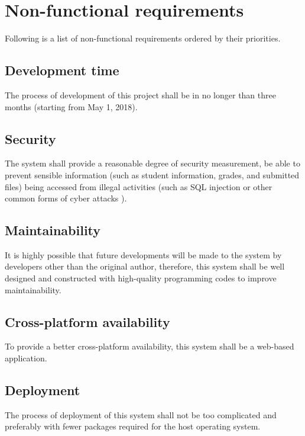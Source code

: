 \pagebreak

\section{Non-functional requirements}
Following is a list of non-functional requirements ordered by their priorities.

\subsection{Development time}
The process of development of this project shall be in no longer than three
months (starting from May 1, 2018).

\subsection{Security}
The system shall provide a reasonable degree of security measurement, 
be able to
prevent sensible information (such as student information, grades, and
submitted files) being accessed from illegal activities (such as SQL injection 
or other common forms of cyber attacks \cite{cyberAttacks}).

\subsection{Maintainability}
It is highly possible that future developments will be made to the system by
developers other than the original author, therefore, this system shall be
well designed and constructed with high-quality programming codes to improve 
maintainability.

\subsection{Cross-platform availability}
To provide a better cross-platform availability, this system shall be a
web-based application.

\subsection{Deployment}
The process of deployment of this system shall not be too complicated and
preferably with fewer packages required for the host operating system.